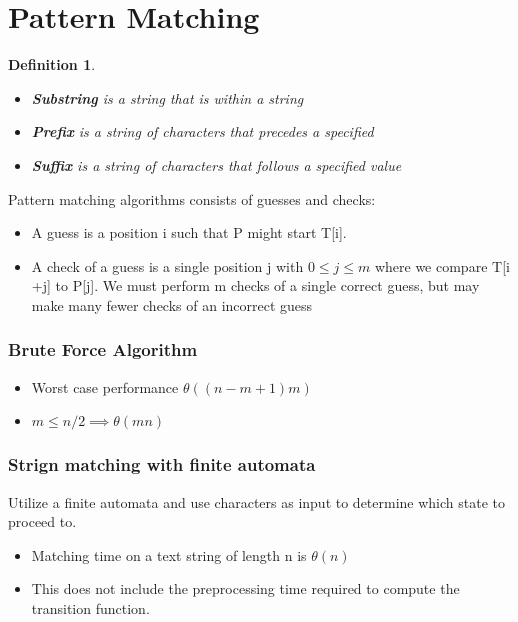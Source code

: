 \documentclass{article}
\newtheorem{definition}[theorem]{Definition}
\begin{document}
\section{Pattern Matching}
\begin{definition}
\begin{itemize}
\item \textbf{Substring} is a string that is within a string 
\item \textbf{Prefix} is a string of characters that precedes a specified 
\item \textbf{Suffix} is a string of characters that follows a specified value
\end{itemize}
\end{definition}

Pattern matching algorithms consists of guesses and checks:
\begin{itemize}
\item A guess is a position i such that P might start T[i].
\item A check of a guess is a single position j with \(0 \leq j \leq m\) where we compare T[i +j] to P[j]. We must perform m checks of a single correct guess, but may make many fewer checks of an incorrect guess
\end{itemize} 

\subsubsection*{Brute Force Algorithm }
\begin{itemize}
\item Worst case performance \(\theta((n - m + 1) m )\)
\item \(m \leq n/2 \implies \theta(mn)\)
\end{itemize}

\subsubsection*{Strign matching with finite automata}
Utilize a finite automata and use characters as input to determine which state to proceed to. 

\begin{itemize}
\item Matching time on a text string of length n is \(\theta(n)\)
\item This does not include the preprocessing time required to compute the transition function. 
\end{itemize}
\end{document}
